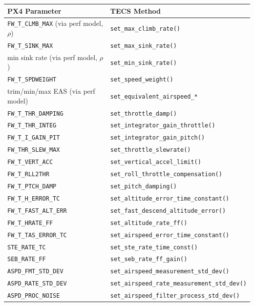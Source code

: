 \documentclass[12pt,a4paper]{article}
\begin{document}
\begin{center}
\begin{tabular}{ll}
\toprule
PX4 Parameter & TECS Method \\
\midrule
\texttt{FW\_T\_CLMB\_MAX} (via perf model, $\rho$) & \texttt{set\_max\_climb\_rate()} \\
\texttt{FW\_T\_SINK\_MAX}         & \texttt{set\_max\_sink\_rate()} \\
min sink rate (via perf model, $\rho$) & \texttt{set\_min\_sink\_rate()} \\
\texttt{FW\_T\_SPDWEIGHT}         & \texttt{set\_speed\_weight()} \\
trim/min/max EAS (via perf model) & \texttt{set\_equivalent\_airspeed\_*} \\
\texttt{FW\_T\_THR\_DAMPING}      & \texttt{set\_throttle\_damp()} \\
\texttt{FW\_T\_THR\_INTEG}        & \texttt{set\_integrator\_gain\_throttle()} \\
\texttt{FW\_T\_I\_GAIN\_PIT}      & \texttt{set\_integrator\_gain\_pitch()} \\
\texttt{FW\_THR\_SLEW\_MAX}       & \texttt{set\_throttle\_slewrate()} \\
\texttt{FW\_T\_VERT\_ACC}         & \texttt{set\_vertical\_accel\_limit()} \\
\texttt{FW\_T\_RLL2THR}           & \texttt{set\_roll\_throttle\_compensation()} \\
\texttt{FW\_T\_PTCH\_DAMP}        & \texttt{set\_pitch\_damping()} \\
\texttt{FW\_T\_H\_ERROR\_TC}      & \texttt{set\_altitude\_error\_time\_constant()} \\
\texttt{FW\_T\_FAST\_ALT\_ERR}    & \texttt{set\_fast\_descend\_altitude\_error()} \\
\texttt{FW\_T\_HRATE\_FF}         & \texttt{set\_altitude\_rate\_ff()} \\
\texttt{FW\_T\_TAS\_ERROR\_TC}    & \texttt{set\_airspeed\_error\_time\_constant()} \\
\texttt{STE\_RATE\_TC}            & \texttt{set\_ste\_rate\_time\_const()} \\
\texttt{SEB\_RATE\_FF}            & \texttt{set\_seb\_rate\_ff\_gain()} \\
\texttt{ASPD\_FMT\_STD\_DEV}      & \texttt{set\_airspeed\_measurement\_std\_dev()} \\
\texttt{ASPD\_RATE\_STD\_DEV}     & \texttt{set\_airspeed\_rate\_measurement\_std\_dev()} \\
\texttt{ASPD\_PROC\_NOISE}        & \texttt{set\_airspeed\_filter\_process\_std\_dev()} \\
\bottomrule
\end{tabular}
\end{center}
\end{document}
